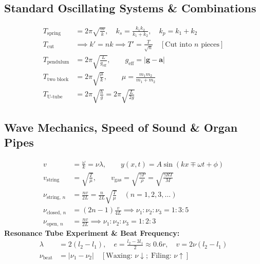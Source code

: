 \documentclass[10pt,twoside,openright]{book}
\begin{document}
\subsection{Standard Oscillating Systems \& Combinations}

\begin{formulabox}
\begin{align}
  T_{\text{spring}} &= 2\pi\sqrt{\frac{m}{k}}, \quad k_s = \frac{k_1 k_2}{k_1 + k_2}, \quad k_p = k_1 + k_2 \\
  T_{\text{cut}} &\implies k' = n k \implies T' = \frac{T}{\sqrt{n}} \quad [\text{Cut into } n \text{ pieces}] \\
  T_{\text{pendulum}} &= 2\pi\sqrt{\frac{L}{g_{\text{eff}}}}, \qquad g_{\text{eff}} = |\mathbf{g} - \mathbf{a}| \\
  T_{\text{two block}} &= 2\pi\sqrt{\frac{\mu}{k}}, \qquad \mu = \frac{m_1 m_2}{m_1 + m_2} \\
  T_{\text{U-tube}} &= 2\pi\sqrt{\frac{h}{g}} = 2\pi\sqrt{\frac{L}{2g}}
\end{align}
\end{formulabox}

\subsection{Wave Mechanics, Speed of Sound \& Organ Pipes}

\begin{formulabox}
\begin{align}
  v &= \frac{\omega}{k} = \nu\lambda, \qquad y(x,t) = A\sin(kx \mp \omega t + \phi) \\
  v_{\text{string}} &= \sqrt{\frac{T}{\mu}}, \qquad v_{\text{gas}} = \sqrt{\frac{\gamma P}{\rho}} = \sqrt{\frac{\gamma R T}{M}} \\
  \nu_{\text{string, } n} &= \frac{n v}{2L} = \frac{n}{2L}\sqrt{\frac{T}{\mu}} \quad (n = 1, 2, 3, \dots) \\
  \nu_{\text{closed, } n} &= (2n - 1)\frac{v}{4L} \implies \nu_1 : \nu_2 : \nu_3 = 1 : 3 : 5 \\
  \nu_{\text{open, } n} &= \frac{n v}{2L} \implies \nu_1 : \nu_2 : \nu_3 = 1 : 2 : 3
\end{align}
\textbf{Resonance Tube Experiment \& Beat Frequency:}
\begin{align}
  \lambda &= 2(l_2 - l_1), \quad e = \frac{l_2 - 3l_1}{2} \approx 0.6 r, \quad v = 2\nu(l_2 - l_1) \\
  \nu_{\text{beat}} &= |\nu_1 - \nu_2| \quad [\text{Waxing: } \nu\downarrow;\; \text{Filing: } \nu\uparrow]
\end{align}
\end{formulabox}
\end{document}

